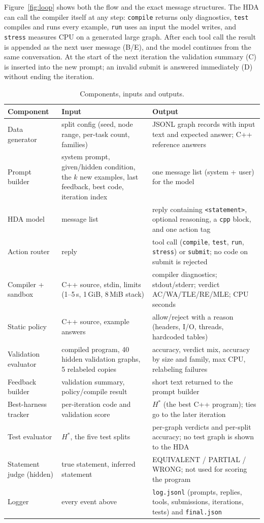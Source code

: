 \documentclass[11pt]{article}
\begin{document}
Figure~\ref{fig:loop} shows both the flow and the exact message structures. The HDA can call
the compiler itself at any step: \texttt{compile} returns only diagnostics,
\texttt{test} compiles and runs every example, \texttt{run} uses an input the
model writes, and \texttt{stress} measures CPU on a generated large graph.
After each tool call the result is appended as the next user message (B/E), and
the model continues from the same conversation. At the start of the next
iteration the validation summary (C) is inserted into the new prompt; an
invalid submit is answered immediately (D) without ending the iteration.



\begin{table}[p]
\centering
\small
\begin{tabular}{p{3.0cm}p{4.6cm}p{5.6cm}}
\toprule
Component & Input & Output \\
\midrule
Data generator & split config (seed, node range, per-task count,
families) & JSONL graph records with input text and expected answer; C++
reference answers \\
Prompt builder & system prompt, given/hidden condition, the $k$ new examples,
last feedback, best code, iteration index & one message list (system + user)
for the model \\
HDA model & message list & reply containing \texttt{<statement>}, optional
reasoning, a \texttt{cpp} block, and one action tag \\
Action router & reply & tool call (\texttt{compile}, \texttt{test},
\texttt{run}, \texttt{stress}) or \texttt{submit}; no code on submit is
rejected \\
Compiler + sandbox & C++ source, stdin, limits (1--5\,s, 1\,GiB, 8\,MiB
stack) & compiler diagnostics; stdout/stderr; verdict AC/WA/TLE/RE/MLE; CPU
seconds \\
Static policy & C++ source, example answers & allow/reject with a reason
(headers, I/O, threads, hardcoded tables) \\
Validation evaluator & compiled program, 40 hidden validation graphs, 5
relabeled copies & accuracy, verdict mix, accuracy by size and family, max
CPU, relabeling failures \\
Feedback builder & validation summary, policy/compile result & short text
returned to the prompt builder \\
Best-harness tracker & per-iteration code and validation score & $H^*$ (the
best C++ program); ties go to the later iteration \\
Test evaluator & $H^*$, the five test splits & per-graph verdicts and
per-split accuracy; no test graph is shown to the HDA \\
Statement judge (hidden) & true statement, inferred statement & EQUIVALENT /
PARTIAL / WRONG; not used for scoring the program \\
Logger & every event above & \texttt{log.jsonl} (prompts, replies, tools,
submissions, iterations, tests) and \texttt{final.json} \\
\bottomrule
\end{tabular}
\caption{Components, inputs and outputs.}
\label{tab:components}
\end{table}
\end{document}
